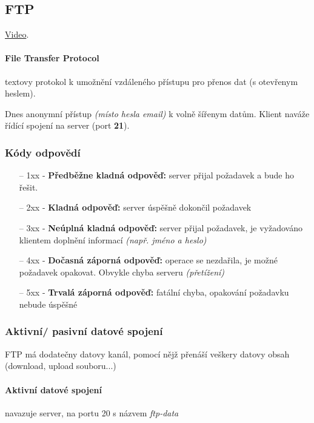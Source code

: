 \documentclass[10pt,a4paper]{article}
\begin{document}
\subsection{FTP}

\href{https://youtu.be/tOj8MSEIbfA}{Video}.

\paragraph{File Transfer Protocol} textovy protokol k umožnění vzdáleného přístupu pro přenos dat (s otevřenym heslem). 

Dnes anonymní přístup \textit{(místo hesla email)} k volně šířenym datům. Klient naváže řídící spojení na server (port \textbf{21}).

\subsubsection{Kódy odpovědí}

\begin{enumerate}
    \item[--] 1xx - \textbf{Předběžne kladná odpověď:} server přijal požadavek a bude ho řešit.
    \item[--] 2xx - \textbf{Kladná odpověď:} server úspěšně dokončil požadavek
    \item[--] 3xx - \textbf{Neúplná kladná odpověď:} server přijal požadavek, je vyžadováno klientem doplnění informací \textit{(např. jméno a heslo)}
    \item[--] 4xx - \textbf{Dočasná záporná odpověď:} operace se nezdařila, je možné požadavek opakovat. Obvykle chyba serveru \textit{(přetížení)}
    \item[--] 5xx - \textbf{Trvalá záporná odpověď:} fatální chyba, opakování požadavku nebude úspěšné
\end{enumerate}

\subsubsection{Aktivní/ pasivní datové spojení}

FTP má dodatečny datovy kanál, pomocí nějž přenáší veškery datovy obsah (download, upload souboru...)

\paragraph{Aktivní datové spojení} navazuje server, na portu 20 s názvem \textit{ftp-data}
\end{document}
